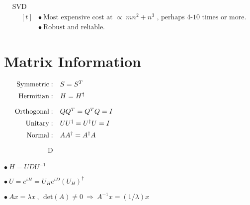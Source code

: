 \documentclass[12pt]{article}
\begin{document}
\vspace{10pt}
\(\begin{aligned}
	&\text{SVD}\\[5pt]
	&\hspace{10pt}\begin{aligned}[t]
		&\bullet\ \text{Most expensive cost at } \propto\ mn^2 + n^3 \text{ , perhaps 4-10 times or more.}\\[2pt]
		&\bullet\ \text{Robust and reliable.}
	\end{aligned}
\end{aligned}\)


\newpage
\section{Matrix Information}
\vspace{10pt}
\begin{minipage}[t]{.49\textwidth}
	\(\hspace{10pt} \begin{array}[t]{r l}
		\text{Symmetric}:& {S = S^T}\\[5pt]
		\text{Hermitian}:& {H = H^\dagger}
		\\[10pt]
		\text{Orthogonal}:& {QQ^T = Q^T Q = I}\\[5pt]
		\text{Unitary}:& {UU^\dagger = U^\dagger U = I}\\[5pt]
		\text{Normal}:& AA^\dagger = A^\dagger A
		\\[10pt]
		\text{D}
	\end{array}\)
\end{minipage}
\begin{minipage}[t]{.49\textwidth}
	\(\bullet\ H = UDU^{-1}\) \hspace{10pt} 

	\bigskip
	\(\bullet\ U = e^{iH} = U_{H} e^{iD} (U_{H})^\dagger\)

	\vspace{10pt}
	\(\bullet\ Ax = \lambda x \ , \ \ \text{det}(A) \neq 0 
		\ \Rightarrow \ A^{-1}x = (1/\lambda)x\)
\end{minipage}
\end{document}
